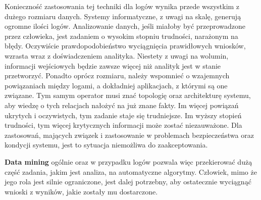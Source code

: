         Konieczność zastosowania tej techniki dla logów wynika przede wszystkim z dużego rozmiaru danych. 
        Systemy informatyczne, z uwagi na skalę, generują ogromne ilości
        logów. Analizowanie danych, jeśli miałoby być przeprowadzone przez człowieka, jest zadaniem
        o wysokim stopniu trudności, narażonym na błędy. Oczywiście prawdopodobieństwo wyciągnięcia
        prawidłowych wniosków, wzrasta wraz z doświadczeniem analityka. Niestety z uwagi na wolumin,
        informacji wejściowych będzie zawsze więcej niż analityk jest w stanie przetworzyć. Ponadto
        oprócz rozmiaru, należy wspomnieć o wzajemnych powiązaniach między logami, a dokładniej
        aplikacjach, z którymi są one związane. Tym samym operator musi znać topologię oraz
        architekturę systemu, aby wiedzę o tych relacjach nałożyć na już znane fakty. Im więcej powiązań
        ukrytych i oczywistych, tym zadanie staje się trudniejsze. Im wyższy stopień trudności,
        tym więcej krytycznych informacji może zostać niezauważone. Dla zastosowań, mających związek i zastosowanie
        w problemach bezpieczeństwa oraz kondycji systemu, jest to sytuacja niemożliwa do zaakceptowania.
        
        \textbf{Data mining} ogólnie oraz w przypadku logów pozwala więc przekierować dużą część zadania, jakim
        jest analiza, na automatyczne algorytmy. Człowiek, mimo że jego rola jest silnie ograniczone, jest
        dalej potrzebny, aby ostatecznie wyciągnąć wnioski z wyników, jakie zostały mu dostarczone.